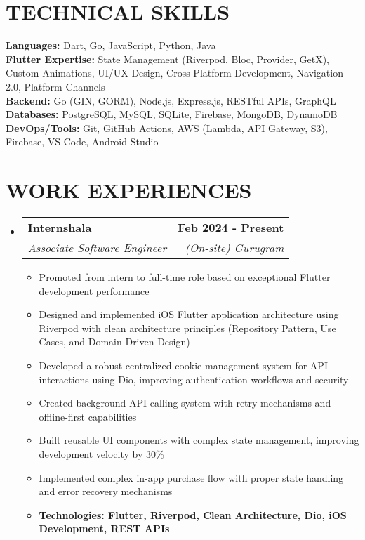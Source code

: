 \documentclass[letterpaper,11pt]{article}
\makeatletter
\newcommand{\resumeItem}[1]{
  \item\small{
    {#1 \vspace{-2pt}}
  }
}
\newcommand{\resumeSubheading}[4]{
  \vspace{-2pt}\item
    \begin{tabular*}{1.0\textwidth}[t]{l@{\extracolsep{\fill}}r}
      \textbf{\large#1} & \textbf{\small #2} \\
      \textit{\large#3} & \textit{\small #4} \\
      
    \end{tabular*}\vspace{-7pt}
}
\newcommand{\resumeSubHeadingListStart}{\begin{itemize}[leftmargin=0.0in, label={}]}
\newcommand{\resumeSubHeadingListEnd}{\end{itemize}}
\newcommand{\resumeItemListStart}{\begin{itemize}}
\newcommand{\resumeItemListEnd}{\end{itemize}\vspace{-5pt}}
\makeatother
\begin{document}
\section{TECHNICAL SKILLS}
 \begin{itemize}[leftmargin=0.15in, label={}]
    \small{\item{
     \textbf{\normalsize{Languages:}}{ \normalsize{Dart, Go, JavaScript, Python, Java}} \\
     \textbf{\normalsize{Flutter Expertise:}}{ \normalsize{State Management (Riverpod, Bloc, Provider, GetX), Custom Animations, UI/UX Design, Cross-Platform Development, Navigation 2.0, Platform Channels}} \\
     \textbf{\normalsize{Backend:}}{ \normalsize{Go (GIN, GORM), Node.js, Express.js, RESTful APIs, GraphQL}} \\
     \textbf{\normalsize{Databases:}}{ \normalsize{PostgreSQL, MySQL, SQLite, Firebase, MongoDB, DynamoDB}} \\
     \textbf{\normalsize{DevOps/Tools:}}{ \normalsize{Git, GitHub Actions, AWS (Lambda, API Gateway, S3), Firebase, VS Code, Android Studio}} \\
    }}
 \end{itemize}
 \vspace{-15pt}

\section{WORK EXPERIENCES}

\resumeSubHeadingListStart

    \resumeSubheading
      {Internshala\href{https://internshala.com/}{\raisebox{-0.1\height}\faLink }}{Feb 2024 - Present} 
      {\underline{Associate Software Engineer}}{(On-site) Gurugram}
      \resumeItemListStart
        \resumeItem{\normalsize{Promoted from intern to full-time role based on exceptional Flutter development performance}}
        \resumeItem{\normalsize{Designed and implemented iOS Flutter application architecture using Riverpod with clean architecture principles (Repository Pattern, Use Cases, and Domain-Driven Design)}}
        \resumeItem{\normalsize{Developed a robust centralized cookie management system for API interactions using Dio, improving authentication workflows and security}}
        \resumeItem{\normalsize{Created background API calling system with retry mechanisms and offline-first capabilities}}
        \resumeItem{\normalsize{Built reusable UI components with complex state management, improving development velocity by 30\%}}
        \resumeItem{\normalsize{Implemented complex in-app purchase flow with proper state handling and error recovery mechanisms}}
        \resumeItem{\normalsize{\textbf{Technologies: Flutter, Riverpod, Clean Architecture, Dio, iOS Development, REST APIs}}}
      \resumeItemListEnd  
  \resumeSubHeadingListEnd
\end{document}
